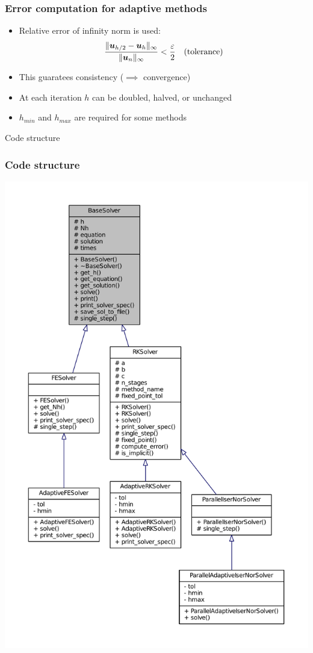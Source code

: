 \documentclass{beamer}
\begin{document}
\begin{frame} %
	\frametitle{Error computation for adaptive methods}
	\begin{itemize}
		\item Relative error of infinity norm is used:
		$$\frac{\lVert\boldsymbol u_{h/2}-\boldsymbol u_h\rVert_\infty}{\lVert\boldsymbol u_n\rVert_\infty} <
		\frac{\varepsilon}{2} \quad \text{(tolerance)}$$
		\item This guaratees consistency ($\implies$ convergence)
		\item At each iteration $h$ can be doubled, halved, or unchanged
		\item $h_{min}$ and $h_{max}$ are required for some methods
	\end{itemize}
\end{frame}


\begin{frame}[c] %
\begin{center}
	\Huge \color{blue} Code structure
\end{center}
\end{frame}


\begin{frame} %
	\frametitle{Code structure}
	\begin{center}
		\includegraphics[width=0.45 \linewidth]{etc/classes_full.pdf}
	\end{center}
\end{frame}
\end{document}
